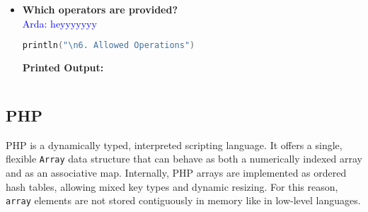 \documentclass{article}
\newcommand{\arda}[1]{\textcolor{blue}{Arda: #1}}
\begin{document}
\begin{itemize}
\item \textbf{Which operators are provided?} \\
\arda{heyyyyyyy}
\begin{lstlisting}[language=Kotlin]
println("\n6. Allowed Operations")

\end{lstlisting}
\textbf{Printed Output:}
\begin{verbatim}
\end{verbatim}
\end{itemize}
\newpage










\subsection{PHP}
PHP is a dynamically typed, interpreted scripting language. It offers a single, flexible \texttt{Array} data structure that can behave as both a numerically indexed array and as an associative map. Internally, PHP arrays are implemented as ordered hash tables, allowing mixed key types and dynamic resizing. For this reason, \texttt{array} elements are not stored contiguously in memory like in low-level languages.
\end{document}
